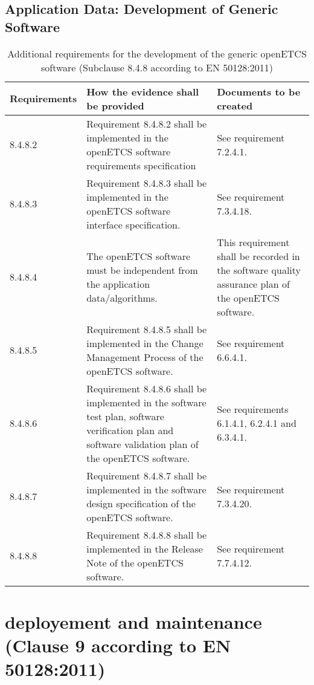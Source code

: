 \documentclass{template/openetcs_report}
\begin{document}
\subsection{Application Data: Development of Generic Software}
{\footnotesize\sffamily\centering
\begin{longtable}{|p{2cm}|p{9cm}|p{3cm}|}
\caption{Additional requirements for the development of the generic openETCS software (Subclause 8.4.8 according to EN 50128:2011)}\\
\hline
\bfseries Requirements & \bfseries How the evidence shall be provided & \bfseries Documents to be created\\
\hline
\hline
\endhead
\hline
\endfoot

8.4.8.2 & Requirement 8.4.8.2 shall be implemented in the openETCS software requirements specification 
& See requirement 7.2.4.1.\\ 
\hline
8.4.8.3 & Requirement 8.4.8.3 shall be implemented in the openETCS software interface specification. & See requirement 7.3.4.18.\\ 
\hline
8.4.8.4 & The openETCS software must be independent from the application data/algorithms. & This requirement shall be recorded in the software quality assurance plan of the openETCS software.\\ 
\hline
8.4.8.5 & Requirement 8.4.8.5 shall be implemented in the Change Management Process of the openETCS software. & See requirement 6.6.4.1.\\ 
\hline
8.4.8.6 & Requirement 8.4.8.6 shall be implemented in the software test plan, software verification plan and software validation plan of the openETCS software. & See requirements 6.1.4.1, 6.2.4.1 and  6.3.4.1.\\ 
\hline
8.4.8.7 & Requirement 8.4.8.7 shall be implemented in the software design specification of the openETCS software. & See requirement 7.3.4.20.\\ 
\hline
8.4.8.8 & Requirement 8.4.8.8 shall be implemented in the Release Note of the openETCS software. & See requirement 7.7.4.12.\\ 
\hline
\end{longtable}}





\section{deployement and maintenance (Clause 9 according to EN 50128:2011)}
\label{clause92}
\end{document}
